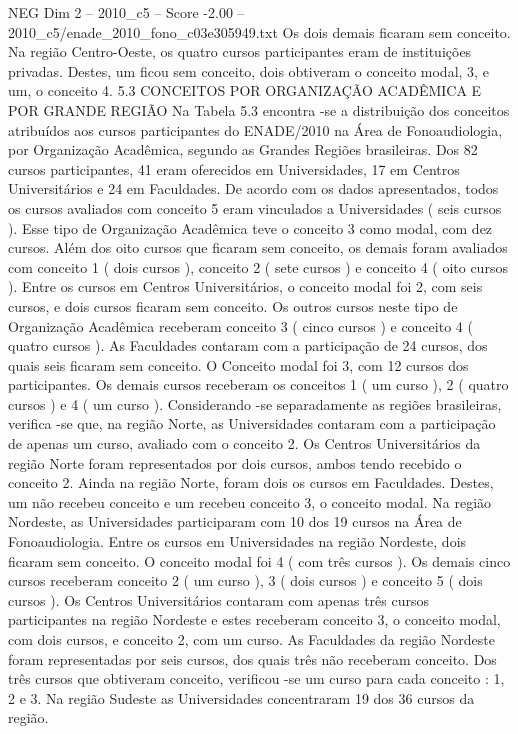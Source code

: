 \begin{textsample}{NEG Dim 2 – 2010\_c5 – Score -2.00 – 2010\_c5/enade\_2010\_fono\_c03e305949.txt}
Os dois demais ficaram sem conceito.
Na região Centro-Oeste, os quatro cursos participantes eram de instituições privadas.
Destes, um ficou sem conceito, dois obtiveram o conceito modal, 3, e um, o conceito 4. 5.3 CONCEITOS POR ORGANIZAÇÃO ACADÊMICA E POR GRANDE REGIÃO Na Tabela 5.3 encontra -se a distribuição dos conceitos atribuídos aos cursos participantes do ENADE/2010 na Área de Fonoaudiologia, por Organização Acadêmica, segundo as Grandes Regiões brasileiras.
Dos 82 cursos participantes, 41 eram oferecidos em Universidades, 17 em Centros Universitários e 24 em Faculdades.
De acordo com os dados apresentados, todos os cursos avaliados com conceito 5 eram vinculados a Universidades ( seis cursos ).
Esse tipo de Organização Acadêmica teve o conceito 3 como modal, com dez cursos.
Além dos oito cursos que ficaram sem conceito, os demais foram avaliados com conceito 1 ( dois cursos ), conceito 2 ( sete cursos ) e conceito 4 ( oito cursos ).
Entre os cursos em Centros Universitários, o conceito modal foi 2, com seis cursos, e dois cursos ficaram sem conceito.
Os outros cursos neste tipo de Organização Acadêmica receberam conceito 3 ( cinco cursos ) e conceito 4 ( quatro cursos ).
As Faculdades contaram com a participação de 24 cursos, dos quais seis ficaram sem conceito.
O Conceito modal foi 3, com 12 cursos dos participantes.
Os demais cursos receberam os conceitos 1 ( um curso ), 2 ( quatro cursos ) e 4 ( um curso ).
Considerando -se separadamente as regiões brasileiras, verifica -se que, na região Norte, as Universidades contaram com a participação de apenas um curso, avaliado com o conceito 2.
Os Centros Universitários da região Norte foram representados por dois cursos, ambos tendo recebido o conceito 2.
Ainda na região Norte, foram dois os cursos em Faculdades.
Destes, um não recebeu conceito e um recebeu conceito 3, o conceito modal.
Na região Nordeste, as Universidades participaram com 10 dos 19 cursos na Área de Fonoaudiologia.
Entre os cursos em Universidades na região Nordeste, dois ficaram sem conceito.
O conceito modal foi 4 ( com três cursos ).
Os demais cinco cursos receberam conceito 2 ( um curso ), 3 ( dois cursos ) e conceito 5 ( dois cursos ).
Os Centros Universitários contaram com apenas três cursos participantes na região Nordeste e estes receberam conceito 3, o conceito modal, com dois cursos, e conceito 2, com um curso.
As Faculdades da região Nordeste foram representadas por seis cursos, dos quais três não receberam conceito.
Dos três cursos que obtiveram conceito, verificou -se um curso para cada conceito : 1, 2 e 3.
Na região Sudeste as Universidades concentraram 19 dos 36 cursos da região.

\end{textsample}
